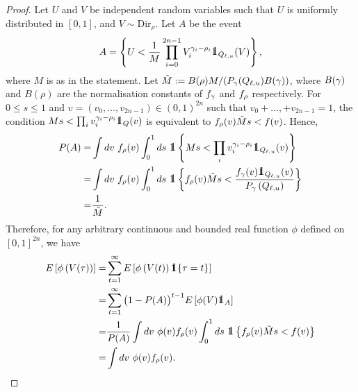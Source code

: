 \documentclass[10pt, article,table]{article}
\begin{document}
\begin{proof}
 Let $U$ and $V$ be independent random variables such that  $U$ is uniformly distributed in $[0,1]$, and $V \sim \text{Dir}_{\rho}$. Let $A$ be the event 
 \begin{equation*}
  A  =
  \left\lbrace
  U < \frac{1}{M} \prod_{i=0}^{2n-1} V_{i}^{\dirparam_i - \rho_i} \one_{Q_{\ell,u}}(V)  
  \right\rbrace,
 \end{equation*}
 where $M$ is as in the statement. Let $\tilde{M}:= B(\rho) M / (\Prob_{\dirparam}(Q_{\ell, u}) B(\dirparam) )$, where $B(\dirparam)$ and  $B(\rho)$ are the normalisation constants of $\dirichletDensity[\dirparam]$ and $\dirichletDensity[\rho]$ respectively.  For $0\leq s \leq 1$ and $v=(v_0,\dots,v_{2n-1}) \in (0,1)^{2n}$ such that $v_0 + \dots, + v_{2n-1} = 1 $, the condition $ M s < \prod_i v_{i}^{\dirparam_i - \rho_i} \one_{Q}(v)$ is equivalent to $\dirichletDensity[\rho](v) \tilde{M} s  < \targetDensity(v)$. Hence, 
 \begin{equation*}
  \begin{split}
   \Prob(A) = &
   \int dv \, \, \dirichletDensity[\rho](v)
   \int_{0}^{1}ds\, \, 
   \one\left\lbrace
   M s < \prod_i v_{i}^{\dirparam_i - \rho_i} \one_{Q_{\ell,u}}(v)
   \right\rbrace
   \\
   = &
   \int dv \,\, \dirichletDensity[\rho](v)
   \int_{0}^{1}ds \, \, 
   \one\left\lbrace
   \dirichletDensity[\rho](v) \tilde{M} s  < \frac{\dirichletDensity(v)\one _{Q_{\ell,u}} (v)}{\dirichletLaw\left(Q_{\ell,u}\right)}
   \right\rbrace
   \\
   = &
   \frac{1}{\tilde{M}}.
  \end{split}
 \end{equation*}
Therefore, for any arbitrary continuous and bounded real function $\phi$ defined on $[0,1]^{2n}$, we have
\begin{equation*}
 \begin{split}
  \Expectation\left[ \phi\left( V(\tau) \right)\right]
  = &
  \sum_{t=1}^{\infty} \Expectation\left[ \phi\left( V(t)\right) \one \lbrace \tau = t \rbrace \right]
  \\
  = & 
  \sum_{t=1}^{\infty} \big(1-\Prob(A)\big)^{t-1}\Expectation\left[ \phi(V)\one_{A}\right]
  \\
  = &
  \frac{1}{\Prob(A)}
  \int dv \,\,\phi(v) \dirichletDensity[\rho](v)
   \int_{0}^{1}ds \, \, 
   \one\left\lbrace
   \dirichletDensity[\rho](v) \tilde{M} s  < \targetDensity(v)
   \right\rbrace
   \\
   = &
   \int dv \,\, \phi(v)  \dirichletDensity[\rho](v).
 \end{split}
\end{equation*}
\end{proof}
\end{document}

